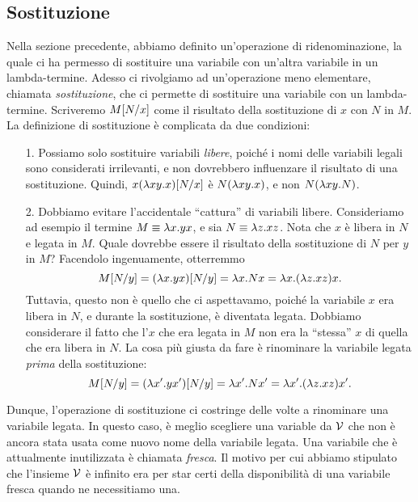 \documentclass{article}
\begin{document}
\subsection{Sostituzione}\label{ssec-sostituzione}

Nella sezione precedente, abbiamo definito un'operazione di 
ridenominazione, la quale ci ha permesso di sostituire una variabile 
con un'altra variabile in un lambda-termine. Adesso ci rivolgiamo ad 
un'operazione meno elementare, chiamata {\em sostituzione}, che ci 
permette di sostituire una variabile con un lambda-termine. Scriveremo
$M[N/x]$ come il risultato della sostituzione di $x$ con $N$ 
in $M$. La definizione di sostituzione \`e complicata da due condizioni:
\begin{enumerate}
\item[1.] Possiamo solo sostituire variabili {\em libere}, poiché i nomi
delle variabili legali sono considerati irrilevanti, e non
dovrebbero influenzare il risultato di una sostituzione. Quindi, $x(\lambda
    xy.x)[N/x]$ \`e $N(\lambda xy.x)$, e non $N(\lambda xy.N)$.
\item[2.] Dobbiamo evitare l'accidentale ``cattura'' di variabili
libere. Consideriamo ad esempio il termine $M\equiv\lambda x.yx$, e sia
  $N\equiv\lambda z.xz$. Nota che $x$ \`e libera in $N$ e legata in $M$.
Quale dovrebbe essere il risultato della sostituzione di $N$ per $y$ in $M$?
Facendolo ingenuamente, otterremmo
  \[ M[N/y]=(\lambda x.yx)[N/y]=
     \lambda x.Nx=\lambda x.(\lambda z.xz)x. 
  \]
  Tuttavia, questo non \`e quello che ci aspettavamo, poiché la variabile $x$
  era libera in $N$, e durante la sostituzione, \`e diventata legata. Dobbiamo
  considerare il fatto che l'$x$ che era legata in $M$ non era la 
  ``stessa'' $x$ di quella che era libera in $N$. La cosa pi\`u giusta da fare
\`e rinominare la variabile legata {\em prima} della sostituzione:
  \[ M[N/y]=(\lambda x'.yx')[N/y]=
     \lambda x'.Nx'=\lambda x'.(\lambda z.xz)x'. 
  \]
\end{enumerate}

Dunque, l'operazione di sostituzione ci costringe delle volte a rinominare
una variabile legata. In questo caso, \`e meglio scegliere una variable da
${\cal V}$ che non \`e ancora stata usata come nuovo nome della variabile
legata. Una variabile che \`e attualmente inutilizzata \`e chiamata {\em fresca}.
Il motivo per cui abbiamo stipulato che l'insieme ${\cal V}$ \`e infinito era per
star certi della disponibilit\`a di una variabile fresca quando ne necessitiamo una.
\end{document}
